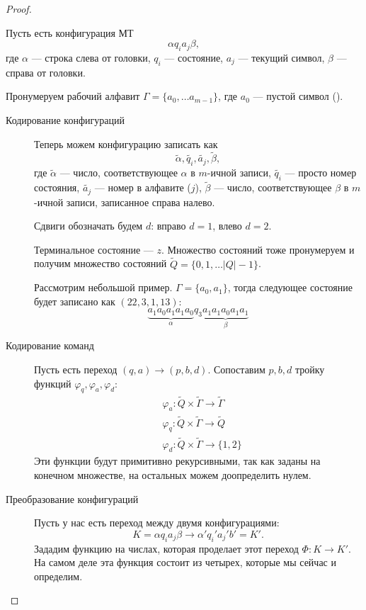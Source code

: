 \begin{proof}
\begin{description}
			Пусть есть конфигурация МТ 
			$$ \alpha q_i a_j \beta ,$$ где $ \alpha $ --- строка слева от головки, $ q_i$ --- состояние, $ a_j$ --- текущий символ, $ \beta $ --- справа от головки.

			Пронумеруем рабочий алфавит $ \Gamma = \{a_0, \ldots a_{m-1}\}$, где $ a_0$ --- пустой символ (\textvisiblespace).

			\begin{description}
				\item[Кодирование конфигураций]
			Теперь можем конфигурацию записать как 
			 \[
				 \widetilde{ \alpha } , \widetilde{ q_i} , \widetilde{ a_j} , \widetilde{ \beta } 
			,\] 
			где $ \widetilde{ \alpha } $ --- число, соответствующее $ \alpha $  в $  m$-ичной записи, $ \widetilde{ q_i} $ --- просто номер состояния, $ \widetilde{ a_j} $ --- номер  в алфавите ($ j$), $ \widetilde{ \beta } $ --- число, соответствующее $ \beta $ в $ m$-ичной записи, записанное справа налево. 

			Сдвиги обозначать будем $ d$: вправо  $d= 1$, влево $ d= 2$.

			Терминальное состояние --- $ z$. 
			Множество состояний тоже пронумеруем и получим множество состояний $ \widetilde{ Q}  = \{0, 1, \ldots \lvert Q \rvert - 1\}$.

			\begin{ex}
			    Рассмотрим небольшой пример. 
				$ \Gamma = \{a_0, a_1\}$, тогда следующее состояние 
				будет записано как $ (22, 3, 1, 13) $:
				\[
					\underbrace{a_1a_0a_1a_1a_0}_{ \alpha } q_3 \underbrace{a_1 a_1 a_0 a_1a_1}_{ \beta }
				\]
			\end{ex}

		\item [Кодирование команд]
			Пусть есть переход $ (q, a) \to (p, b, d)$. Сопоставим $ p, b, d$ тройку функций $ \varphi _{q}, \varphi _{a}, \varphi _{d}$:
			\[
			\begin{aligned}
				&\varphi _a \colon \widetilde{ Q} \times \widetilde{ \Gamma  }  \to \widetilde{ \Gamma } \\
				& \varphi _{q} \colon \widetilde{ Q} \times \widetilde{ \Gamma }  \to  \widetilde{ Q} \\
				& \varphi _{d} \colon \widetilde{ Q} \times \widetilde{ \Gamma } \to \{1, 2\}
			\end{aligned}
			\]
			Эти функции будут примитивно рекурсивными, так как заданы на конечном множестве, на остальных можем доопределить нулем.
		\item[Преобразование конфигураций]
			Пусть у нас есть переход между двумя конфигурациями: 
			$$ K = \alpha q_i a_j \beta  \to \alpha ' q_i' a_j' b' = K'.$$
			Зададим функцию на числах, которая проделает этот переход $ \Phi \colon K \to  K'$. На самом деле эта функция состоит из четырех, которые мы сейчас и определим.


\end{description}
\end{description}
\end{proof}
